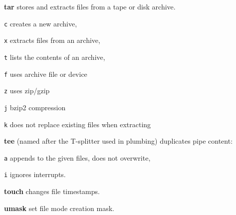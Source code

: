\textbf{tar} stores and extracts files from a tape or disk archive.
\begin{enumx}
	\item [\texttt{c}] creates a new archive,
	\item [\texttt{x}] extracts files from an archive,
	\item [\texttt{t}] lists the contents of an archive,
	\item [\texttt{f}] uses archive file or device
	\item [\texttt{z}] uses zip/gzip
	\item [\texttt{j}] bzip2 compression
	\item [\texttt{k}] does not replace existing files when extracting
\end{enumx}

\textbf{tee} (named after the T-splitter used in plumbing) duplicates pipe content:
\begin{enumx}
	\item [\texttt{a}] appends to the given files, does not overwrite,
	\item [\texttt{i}] ignores interrupts.
\end{enumx}

\textbf{touch} changes file timestamps.


\textbf{umask} set file mode creation mask.
 